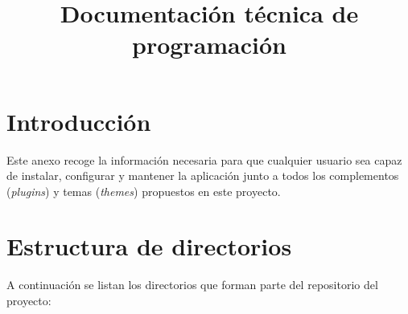 \documentclass[
]{article}
\title{Documentación técnica de programación}
\author{}
\date{}
\begin{document}
\maketitle

\hypertarget{introducciuxf3n}{%
\section{Introducción}\label{introducciuxf3n}}

Este anexo recoge la información necesaria para que cualquier usuario
sea capaz de instalar, configurar y mantener la aplicación junto a todos
los complementos (\emph{plugins}) y temas (\emph{themes}) propuestos en
este proyecto.

\hypertarget{estructura-de-directorios}{%
\section{Estructura de directorios}\label{estructura-de-directorios}}

A continuación se listan los directorios que forman parte del
repositorio del proyecto:
\end{document}
